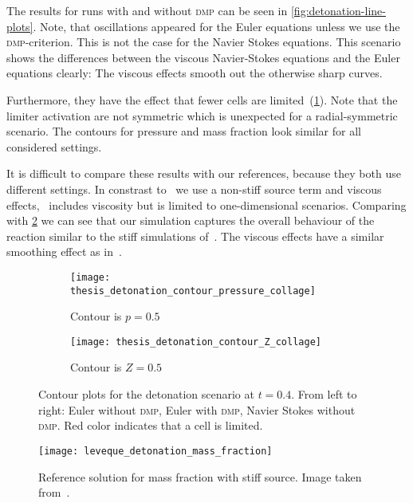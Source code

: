 The results for runs with and without \textsc{dmp} can be seen in \cref{fig:detonation-line-plots}.
Note, that oscillations appeared for the Euler equations unless we use the \textsc{dmp}-criterion.
This is not the case for the Navier Stokes equations.
This scenario shows the differences between the viscous Navier-Stokes equations and the Euler equations clearly:
The viscous effects smooth out the otherwise sharp curves.

Furthermore, they have the effect that fewer cells are limited~(\cref{fig:detonation-pressure-contour}).
Note that the limiter activation are not symmetric which is unexpected for a radial-symmetric scenario.
The contours for pressure and mass fraction look similar for all considered settings.

It is difficult to compare these results with our references, because they both use different settings.
In constrast to~\cite{helzel2000modified} we use a non-stiff source term and viscous effects,~\cite{hidalgo2011ader} includes viscosity but is limited to one-dimensional scenarios.
Comparing with \cref{fig:detonation-contour-reference} we can see that our simulation captures the overall behaviour of the reaction similar to the stiff simulations of~\cite{helzel2000modified}.
The viscous effects have a similar smoothing effect as in~\cite{hidalgo2011ader}.

\begin{figure}[htb]
  \centering
  \begin{subfigure}[t]{1.0\textwidth}
    \centering
  \texttt{[image: thesis\_detonation\_contour\_pressure\_collage]} 
  \caption{Contour is $p = 0.5$}
  \end{subfigure}
  \begin{subfigure}[t]{1.0\textwidth}
    \centering
  \texttt{[image: thesis\_detonation\_contour\_Z\_collage]} 
  \caption{Contour is $Z = 0.5$}
  \end{subfigure}
  \caption{\label{fig:detonation-pressure-contour}%
    Contour plots for the detonation scenario at $t=0.4$.
    From left to right: Euler without \textsc{dmp}, Euler with \textsc{dmp}, Navier Stokes without \textsc{dmp}.
    Red color indicates that a cell is limited.
  }
\end{figure}

\begin{figure}[htb]
    \centering
    \texttt{[image: leveque\_detonation\_mass\_fraction]}
    \caption{\label{fig:detonation-contour-reference}Reference solution for mass fraction with stiff source.
      Image taken from~\cite{helzel2000modified}.}
\end{figure}


